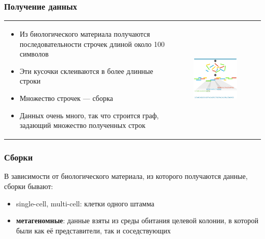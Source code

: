 \documentclass{beamer}
\begin{document}
\begin{frame}
    \frametitle{Получение данных}
    \begin{tabular}{p{5cm} p{7cm}}
        \begin{itemize}
            \item Из биологического материала получаются последовательности строчек длиной около 100 символов
            \item Эти кусочки склеиваются в более длинные строки
            \item Множество строчек --- сборка
            \item Данных очень много, так что строится граф, задающий множество полученных строк
        \end{itemize}
        &
        \begin{figure}[b]
            \centering
            \includegraphics[width=6.5cm]{pictures/readsAssembly.png}  
        \end{figure}
    \end{tabular}
\end{frame}

\begin{frame}
    \frametitle{Сборки}
    В зависимости от биологического материала, из которого получаются данные, сборки
    бывают:
    \begin{itemize}
        \item single-cell, multi-cell: клетки одного штамма
        \item \textbf{метагеномные}: данные взяты из среды обитания целевой колонии, в которой были как её представители, так и соседствующих
    \end{itemize}
\end{frame}
\end{document}
